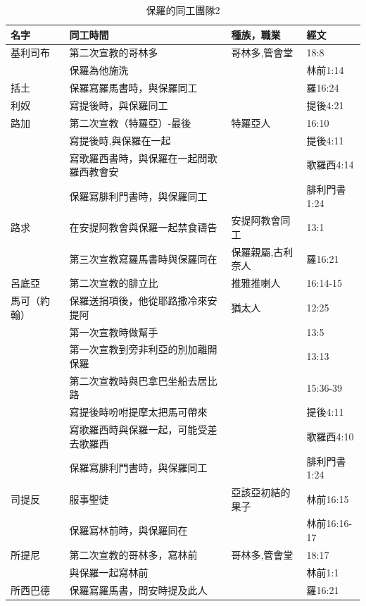 \begin{table}[htbp]
  \centering
    \begin{tabular}{|l|l|l|l|}
    \toprule
   名字 & 同工時間  & 種族，職業 &   經文\\     
    \midrule
       基利司布 &第二次宣教的哥林多 &哥林多,管會堂 &18:8\\  
     &  保羅為他施洗  &  & 林前1:14 \\   
    \midrule   
    括土 &保羅寫羅馬書時，與保羅同工 & &羅16:24\\ \midrule
 利奴&寫提後時，與保羅同工  &  & 提後4:21 \\ \midrule    
     路加 &第二次宣教（特羅亞）-最後 &特羅亞人 &16:10 \\   
    &寫提後時,與保羅在一起 &  &提後4:11 \\
    &寫歌羅西書時，與保羅在一起問歌羅西教會安 &  &歌羅西4:14 \\ 
      &保羅寫腓利門書時，與保羅同工 & &腓利門書1:24\\  \midrule    
      路求 & 在安提阿教會與保羅一起禁食禱告&安提阿教會同工 &13:1  \\
 & 第三次宣教寫羅馬書時與保羅同在& 保羅親屬,古利奈人 & 羅16:21 \\ \midrule
     呂底亞&第二次宣教的腓立比 &推雅推喇人 &16:14-15 \\     \midrule
    馬可（約翰）   &保羅送捐項後，他從耶路撒冷來安提阿 &猶太人 &12:25 \\
    &第一次宣教時做幫手 & &13:5 \\
       &第一次宣教到旁非利亞的別加離開保羅 & &13:13 \\
       &第二次宣教時與巴拿巴坐船去居比路 & &15:36-39 \\      
     &寫提後時吩咐提摩太把馬可帶來 & &提後4:11 \\
       &寫歌羅西時與保羅一起，可能受差去歌羅西 & &歌羅西4:10 \\
       &保羅寫腓利門書時，與保羅同工 & &腓利門書1:24\\
       \midrule 
  司提反&服事聖徒& 亞該亞初結的果子&林前16:15\\
&保羅寫林前時，與保羅同在 & &林前16:16-17\\ \midrule  
     所提尼 &第二次宣教的哥林多，寫林前 &哥林多,管會堂 &18:17  \\ 
          &與保羅一起寫林前 &  & 林前1:1 \\  
  所西巴德 &保羅寫羅馬書，問安時提及此人 & &羅16:21 \\ 
     \bottomrule
    \end{tabular}%
      \caption{保羅的同工團隊2}
  \label{tab:addlabel}%
\end{table}%

